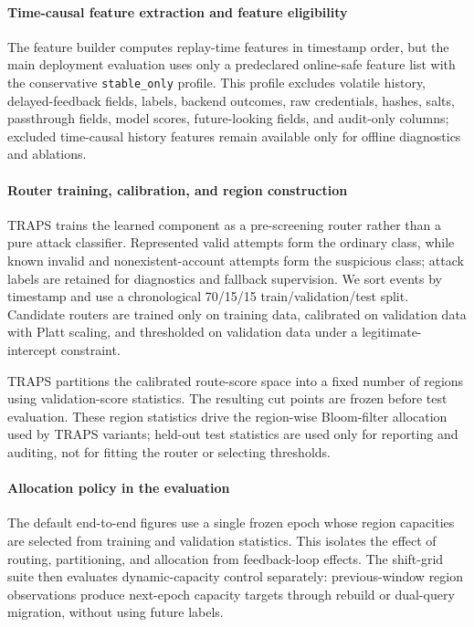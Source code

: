 \paragraph{Time-causal feature extraction and feature eligibility}
The feature builder computes replay-time features in timestamp order, but the main deployment evaluation uses only a predeclared online-safe feature list with the conservative \texttt{stable\_only} profile. This profile excludes volatile history, delayed-feedback fields, labels, backend outcomes, raw credentials, hashes, salts, passthrough fields, model scores, future-looking fields, and audit-only columns; excluded time-causal history features remain available only for offline diagnostics and ablations.

\paragraph{Router training, calibration, and region construction}
TRAPS trains the learned component as a pre-screening router rather than a pure attack classifier. Represented valid attempts form the ordinary class, while known invalid and nonexistent-account attempts form the suspicious class; attack labels are retained for diagnostics and fallback supervision. We sort events by timestamp and use a chronological 70/15/15 train/validation/test split. Candidate routers are trained only on training data, calibrated on validation data with Platt scaling, and thresholded on validation data under a legitimate-intercept constraint.

TRAPS partitions the calibrated route-score space into a fixed number of regions using validation-score statistics. The resulting cut points are frozen before test evaluation. These region statistics drive the region-wise Bloom-filter allocation used by TRAPS variants; held-out test statistics are used only for reporting and auditing, not for fitting the router or selecting thresholds.

\paragraph{Allocation policy in the evaluation}
The default end-to-end figures use a single frozen epoch whose region capacities are selected from training and validation statistics. This isolates the effect of routing, partitioning, and allocation from feedback-loop effects. The shift-grid suite then evaluates dynamic-capacity control separately: previous-window region observations produce next-epoch capacity targets through rebuild or dual-query migration, without using future labels.

